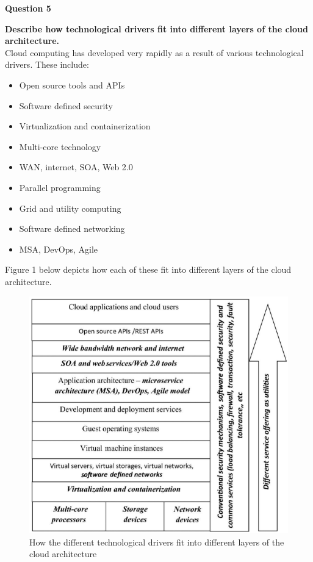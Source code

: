 \documentclass[a4paper, 12pt]{article}
\begin{document}
\newpage
\begin{center}
\textbf{Question 5}\\
\end{center}
\textbf{Describe how technological drivers fit into different layers of the cloud architecture.}\\
Cloud computing has developed very rapidly as a result of various technological drivers. These include:
\begin{itemize}
\item
Open source tools and APIs
\item
Software defined security
\item
Virtualization and containerization
\item
Multi-core technology
\item
WAN, internet, SOA, Web 2.0
\item
Parallel programming
\item
Grid and utility computing
\item
Software defined networking
\item
MSA, DevOps, Agile
\end{itemize}

Figure 1 below depicts how each of these fit into different layers of the cloud architecture.\\

\begin{figure}[H]
	\centering
	\includegraphics[width=\linewidth]{technological_drivers.png}
  	\caption{How the different technological drivers fit into different layers of the cloud architecture}
	\label{fig:4-waycache}
\end{figure}
\end{document}
